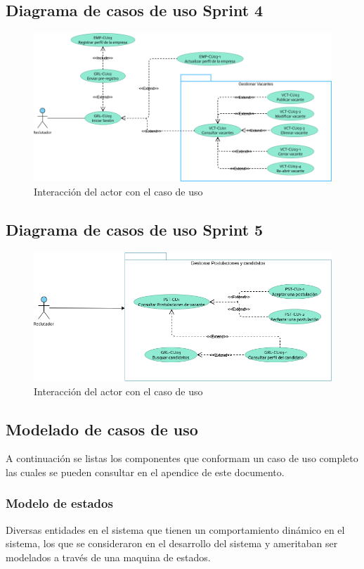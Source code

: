 \subsection{Diagrama de casos de uso Sprint 4}
\begin{figure}[hbtp!]
	\begin{center}
		\includegraphics[width=.5\textwidth]{propuesta/imagenes/sprin4R.png}
	\end{center}
	\label{fig:acUC}
	\caption{Interacción del actor con el caso de uso}
\end{figure}

\subsection{Diagrama de casos de uso Sprint 5}
\begin{figure}[hbtp!]
	\begin{center}
		\includegraphics[width=.5\textwidth]{propuesta/imagenes/Sprint5.png}
	\end{center}
	\label{fig:acUC}
	\caption{Interacción del actor con el caso de uso}
\end{figure}


\subsection{Modelado de casos de uso}
A continuación se listas los componentes que conformam un caso de uso completo las cuales se pueden consultar en
el apendice de este documento.

\subsubsection{Modelo de estados}

Diversas entidades en el sistema  que tienen un comportamiento dinámico en el sistema, 
los que se consideraron en el desarrollo del sistema y ameritaban ser modelados a través de una 
maquina de estados.\\

